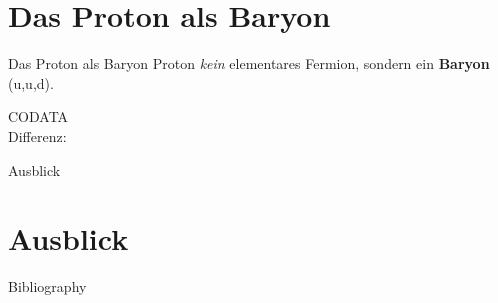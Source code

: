 \documentclass[t,9pt]{beamer}
\begin{document}
        \section{Das Proton als Baryon}
        \begin{frame}{Das Proton als Baryon}
                \pause
                Proton \textit{kein} elementares Fermion, sondern ein \textbf{Baryon} (u,u,d).
                \pause
                \begin{center}
                \end{center}
                \tiny\hfill CODATA\cite{CODATA_proton_magneton}\normalsize
                \pause
                \\ Differenz: 
                \begin{center}
                \end{center}
        \end{frame}

        \begin{frame}{Ausblick}
                \section{Ausblick}
                
        \end{frame}

        \begin{frame}{Bibliography}
                \tiny
                
                
        \end{frame}
                
\end{document}
